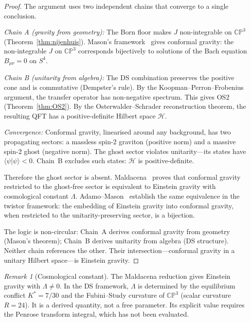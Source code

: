 \documentclass[11pt,a4paper]{article}
\theoremstyle{definition}
\theoremstyle{remark}
\newtheorem{remark}[theorem]{Remark}
\newcommand{\CP}{\mathbb{CP}}
\begin{document}
\begin{proof}
The argument uses two independent chains that converge to a single conclusion.

\emph{Chain A (gravity from geometry):} The Born floor makes $J$ non-integrable on $\CP^3$ (Theorem~\ref{thm:nijenhuis}). Mason's framework~\cite{Mason2005} gives conformal gravity: the non-integrable $J$ on $\CP^3$ corresponds bijectively to solutions of the Bach equation $B_{\mu\nu}=0$ on $S^4$.

\emph{Chain B (unitarity from algebra):} The DS combination preserves the positive cone and is commutative (Dempster's rule). By the Koopman--Perron--Frobenius argument, the transfer operator has non-negative spectrum. This gives OS2 (Theorem~\ref{thm:OS2}). By the Osterwalder--Schrader reconstruction theorem, the resulting QFT has a positive-definite Hilbert space $\mathcal{H}$.

\emph{Convergence:} Conformal gravity, linearised around any background, has two propagating sectors: a massless spin-$2$ graviton (positive norm) and a massive spin-$2$ ghost (negative norm). The ghost sector violates unitarity---its states have $\langle\psi|\psi\rangle<0$. Chain~B excludes such states: $\mathcal{H}$ is positive-definite.

Therefore the ghost sector is absent. Maldacena~\cite{Maldacena2011} proves that conformal gravity restricted to the ghost-free sector is equivalent to Einstein gravity with cosmological constant $\Lambda$. Adamo--Mason~\cite{AdamoMason2014} establish the same equivalence in the twistor framework: the embedding of Einstein gravity into conformal gravity, when restricted to the unitarity-preserving sector, is a bijection.

The logic is non-circular: Chain~A derives conformal gravity from geometry (Mason's theorem); Chain~B derives unitarity from algebra (DS structure). Neither chain references the other. Their intersection---conformal gravity in a unitary Hilbert space---is Einstein gravity.
\end{proof}

\begin{remark}[Cosmological constant]
The Maldacena reduction gives Einstein gravity with $\Lambda\neq 0$. In the DS framework, $\Lambda$ is determined by the equilibrium conflict $K^*=7/30$ and the Fubini--Study curvature of $\CP^3$ (scalar curvature $R=24$). It is a derived quantity, not a free parameter. Its explicit value requires the Penrose transform integral, which has not been evaluated.
\end{remark}
\end{document}
